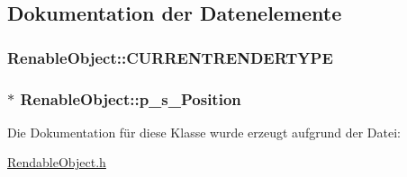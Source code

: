 \subsection{Dokumentation der Datenelemente}
\hypertarget{class_renable_object_ac47152b0849e69f97e9771d0562112f1}{
\subsubsection[{C\-U\-R\-R\-E\-N\-T\-R\-E\-N\-D\-E\-R\-T\-Y\-P\-E}]{ Renable\-Object\-::\-C\-U\-R\-R\-E\-N\-T\-R\-E\-N\-D\-E\-R\-T\-Y\-P\-E\hspace{0.3cm}{\ttfamily [private]}}}\label{class_renable_object_ac47152b0849e69f97e9771d0562112f1}
\hypertarget{class_renable_object_aecde2f6ac264d9cbcf8f63da9a91f1af}{
\subsubsection[{p\-\_\-s\-\_\-\-Position}]{$\ast$ Renable\-Object\-::p\-\_\-s\-\_\-\-Position\hspace{0.3cm}{\ttfamily [private]}}}\label{class_renable_object_aecde2f6ac264d9cbcf8f63da9a91f1af}


Die Dokumentation für diese Klasse wurde erzeugt aufgrund der Datei\-:\begin{DoxyCompactItemize}
\item 
\hyperlink{_rendable_object_8h}{Rendable\-Object.\-h}\end{DoxyCompactItemize}
